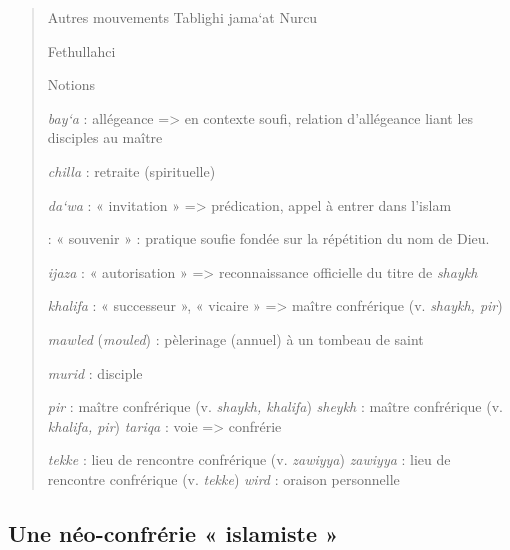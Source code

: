 \begin{quote}
{Autres mouvements} Tablighi jama`at Nurcu

Fethullahci

{Notions}

\emph{bay`a} : allégeance =\textgreater{} en contexte soufi, relation
d'allégeance liant les disciples au maître

\emph{chilla} : retraite (spirituelle)

\emph{da`wa} : « invitation » =\textgreater{} prédication, appel à
entrer dans l'islam

\begin{Def} : « souvenir » : pratique soufie fondée sur la
répétition du nom de Dieu. 
\end{Def}
\emph{ijaza} : « autorisation »
=\textgreater{} reconnaissance officielle du titre de \emph{shaykh}

\emph{khalifa} : « successeur », « vicaire » =\textgreater{} maître
confrérique (v. \emph{shaykh, pir})

\emph{mawled} (\emph{mouled}) : pèlerinage (annuel) à un tombeau de
saint

\emph{murid} : disciple

\emph{pir} : maître confrérique (v. \emph{shaykh, khalifa})
\emph{sheykh} : maître confrérique (v. \emph{khalifa, pir})
\emph{tariqa} : voie =\textgreater{} confrérie

\emph{tekke} : lieu de rencontre confrérique (v. \emph{zawiyya})
\emph{zawiyya} : lieu de rencontre confrérique (v. \emph{tekke})
\emph{wird} : oraison personnelle
\end{quote}

\hypertarget{une-nuxe9o-confruxe9rie-islamiste}{%
\subsection{\texorpdfstring{{Une néo-confrérie « islamiste
»}}{Une néo-confrérie « islamiste »}}\label{une-nuxe9o-confruxe9rie-islamiste}}

